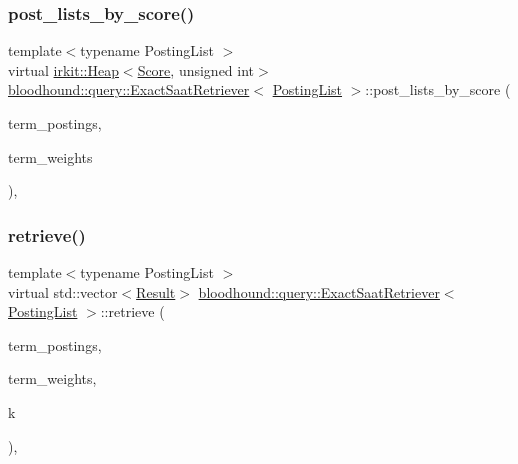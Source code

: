 \subsubsection{\texorpdfstring{post\+\_\+lists\+\_\+by\+\_\+score()}{post\_lists\_by\_score()}}
{\footnotesize\ttfamily template$<$typename Posting\+List $>$ \\
virtual \hyperlink{classirkit_1_1Heap}{irkit\+::\+Heap}$<$\hyperlink{structbloodhound_1_1Score}{Score}, unsigned int$>$ \hyperlink{classbloodhound_1_1query_1_1ExactSaatRetriever}{bloodhound\+::query\+::\+Exact\+Saat\+Retriever}$<$ \hyperlink{classbloodhound_1_1PostingList}{Posting\+List} $>$\+::post\+\_\+lists\+\_\+by\+\_\+score (\begin{DoxyParamCaption}\item[{const std\+::vector$<$ \hyperlink{classbloodhound_1_1PostingList}{Posting\+List} $>$ \&}]{term\+\_\+postings,  }\item[{const std\+::vector$<$ \hyperlink{structbloodhound_1_1Score}{Score} $>$ \&}]{term\+\_\+weights }\end{DoxyParamCaption})\hspace{0.3cm}{\ttfamily [inline]}, {\ttfamily [virtual]}}

\mbox{\label{classbloodhound_1_1query_1_1ExactSaatRetriever_aced2763cc2a4c12838fef4a20759049e}} 
\subsubsection{\texorpdfstring{retrieve()}{retrieve()}}
{\footnotesize\ttfamily template$<$typename Posting\+List $>$ \\
virtual std\+::vector$<$\hyperlink{structbloodhound_1_1query_1_1Result}{Result}$>$ \hyperlink{classbloodhound_1_1query_1_1ExactSaatRetriever}{bloodhound\+::query\+::\+Exact\+Saat\+Retriever}$<$ \hyperlink{classbloodhound_1_1PostingList}{Posting\+List} $>$\+::retrieve (\begin{DoxyParamCaption}\item[{const std\+::vector$<$ \hyperlink{classbloodhound_1_1PostingList}{Posting\+List} $>$ \&}]{term\+\_\+postings,  }\item[{const std\+::vector$<$ \hyperlink{structbloodhound_1_1Score}{Score} $>$ \&}]{term\+\_\+weights,  }\item[{std\+::size\+\_\+t}]{k }\end{DoxyParamCaption})\hspace{0.3cm}{\ttfamily [inline]}, {\ttfamily [virtual]}}



